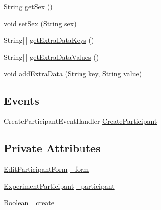 \begin{DoxyCompactItemize}
String \hyperlink{class_web_analyzer_1_1_u_i_1_1_interaction_objects_1_1_participant_control_aa6fff7010ab96f3305ef55da8697c636}{get\+Sex} ()
\item 
void \hyperlink{class_web_analyzer_1_1_u_i_1_1_interaction_objects_1_1_participant_control_a889ab843cc8afc4fb322c167f255baa8}{set\+Sex} (String sex)
\item 
String\mbox{[}$\,$\mbox{]} \hyperlink{class_web_analyzer_1_1_u_i_1_1_interaction_objects_1_1_participant_control_a28a3491cdd7ee8a3be6da78a83d154d4}{get\+Extra\+Data\+Keys} ()
\item 
String\mbox{[}$\,$\mbox{]} \hyperlink{class_web_analyzer_1_1_u_i_1_1_interaction_objects_1_1_participant_control_a6bd9c0492867f0c71038065afea17312}{get\+Extra\+Data\+Values} ()
\item 
void \hyperlink{class_web_analyzer_1_1_u_i_1_1_interaction_objects_1_1_participant_control_adbcd1d9e24fe7d5bcf2f68c618cabfe1}{add\+Extra\+Data} (String key, String \hyperlink{_u_i_2_h_t_m_l_resources_2js_2lib_2underscore_8min_8js_af7e1471ab89699458c4df8bb657298f6}{value})
\end{DoxyCompactItemize}
\subsection*{Events}
\begin{DoxyCompactItemize}
\item 
Create\+Participant\+Event\+Handler \hyperlink{class_web_analyzer_1_1_u_i_1_1_interaction_objects_1_1_participant_control_a05567dca7355e947bf348985f4227d36}{Create\+Participant}
\end{DoxyCompactItemize}
\subsection*{Private Attributes}
\begin{DoxyCompactItemize}
\item 
\hyperlink{class_web_analyzer_1_1_u_i_1_1_edit_participant_form}{Edit\+Participant\+Form} \hyperlink{class_web_analyzer_1_1_u_i_1_1_interaction_objects_1_1_participant_control_ab9a43552c6e7c3b421ddc4d1a4c3dc2b}{\+\_\+form}
\item 
\hyperlink{class_web_analyzer_1_1_models_1_1_base_1_1_experiment_participant}{Experiment\+Participant} \hyperlink{class_web_analyzer_1_1_u_i_1_1_interaction_objects_1_1_participant_control_ae7f805fadde2e1d9088c751bc5860b94}{\+\_\+participant}
\item 
Boolean \hyperlink{class_web_analyzer_1_1_u_i_1_1_interaction_objects_1_1_participant_control_a9526dab215a152dae475ec8b6098f15d}{\+\_\+create}
\end{DoxyCompactItemize}
